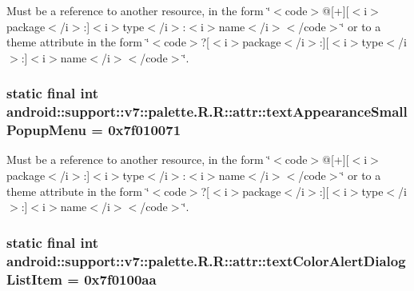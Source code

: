 Must be a reference to another resource, in the form \char`\"{}$<$code$>$@\mbox{[}+\mbox{]}\mbox{[}$<$i$>$package$<$/i$>$:\mbox{]}$<$i$>$type$<$/i$>$:$<$i$>$name$<$/i$>$$<$/code$>$\char`\"{} or to a theme attribute in the form \char`\"{}$<$code$>$?\mbox{[}$<$i$>$package$<$/i$>$:\mbox{]}\mbox{[}$<$i$>$type$<$/i$>$:\mbox{]}$<$i$>$name$<$/i$>$$<$/code$>$\char`\"{}. \hypertarget{classandroid_1_1support_1_1v7_1_1palette_1_1_r_1_1attr_d48a46f661013fc1dae8f0eb41d96802}{
\subsubsection[{textAppearanceSmallPopupMenu}]{\setlength{\rightskip}{0pt plus 5cm}static final int android::support::v7::palette.R.R::attr::textAppearanceSmallPopupMenu = 0x7f010071}}
\label{classandroid_1_1support_1_1v7_1_1palette_1_1_r_1_1attr_d48a46f661013fc1dae8f0eb41d96802}


Must be a reference to another resource, in the form \char`\"{}$<$code$>$@\mbox{[}+\mbox{]}\mbox{[}$<$i$>$package$<$/i$>$:\mbox{]}$<$i$>$type$<$/i$>$:$<$i$>$name$<$/i$>$$<$/code$>$\char`\"{} or to a theme attribute in the form \char`\"{}$<$code$>$?\mbox{[}$<$i$>$package$<$/i$>$:\mbox{]}\mbox{[}$<$i$>$type$<$/i$>$:\mbox{]}$<$i$>$name$<$/i$>$$<$/code$>$\char`\"{}. \hypertarget{classandroid_1_1support_1_1v7_1_1palette_1_1_r_1_1attr_068933e235e4b5e7fe0ff81b4aaf772b}{
\subsubsection[{textColorAlertDialogListItem}]{\setlength{\rightskip}{0pt plus 5cm}static final int android::support::v7::palette.R.R::attr::textColorAlertDialogListItem = 0x7f0100aa}}
\label{classandroid_1_1support_1_1v7_1_1palette_1_1_r_1_1attr_068933e235e4b5e7fe0ff81b4aaf772b}


